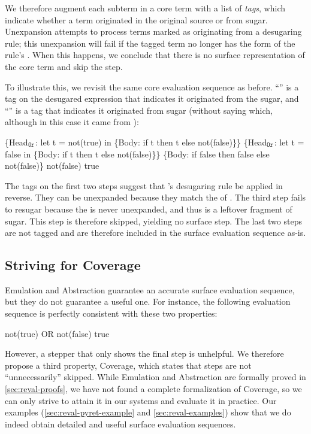 We therefore augment each subterm in a core term
with a list of \emph{tags}, which indicate whether a term
originated in the original source or from sugar.%
Unexpansion attempts to process terms marked as
originating from a desugaring rule; this
unexpansion will fail if the tagged term no longer has the form of
the rule's . When this happens, we conclude that there is no
surface representation of the core term and skip the step.

To illustrate this, we revisit the same core evaluation sequence as
before. \newline %
``'' is a tag on the desugared expression that
indicates it originated from the  sugar, and ``''
is a tag that indicates it originated from sugar (without saying
which, although in this case it came from ):
\begin{Codes}
    \{Head\(\sb{\texttt{Or}}\): let t = not(true) in
      \{Body: if t then t else not(false)\}\}
\CoreStep \{Head\(\sb{\texttt{Or}}\): let t = false in
      \{Body: if t then t else not(false)\}\}
\CoreStep \{Body: if false then false else not(false)\}
\CoreStep not(false)
\CoreStep true
\end{Codes}
The tags on the first two steps suggest that 's
desugaring rule be applied in reverse. They can be unexpanded
because they match the  of . The third step fails to
resugar because the  is never unexpanded, and thus is a
leftover fragment of sugar. This step is therefore skipped, yielding no
surface step. The last two steps are not tagged and are
therefore included in the surface evaluation sequence as-is.

\subsection{Striving for Coverage}

Emulation and Abstraction guarantee an accurate
surface evaluation sequence, but they do not guarantee a useful one. For
instance, the following evaluation sequence is perfectly consistent with
these two properties:
\begin{Codes}
    not(true) OR not(false)
\SurfStep true
\end{Codes}
However, a stepper that only shows the final step is unhelpful. We therefore
propose a third property, Coverage, which states that steps
are not ``unnecessarily'' skipped. While Emulation and
Abstraction are formally proved in \cref{sec:reval-proofs}, we have not found a
complete formalization of Coverage, so we can only strive to attain it in
our systems and evaluate it in practice.
Our examples
(\cref{sec:reval-pyret-example} and \cref{sec:reval-examples}) show
that we do indeed obtain detailed and useful surface evaluation sequences.

